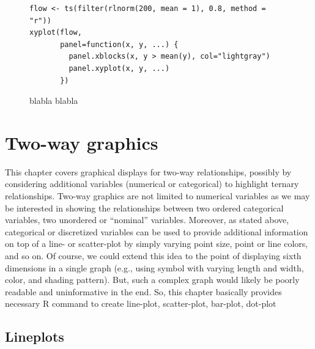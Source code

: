 \documentclass[a4paper,twoside]{book}
\newcounter{fig}
\newcommand{\img}[1]{\texttt{[image: \#1]}\stepcounter{fig}}
\renewcommand{\texttt}[1]{\lstinline{#1}}
\newcommand{\R}{\textsf{R}\xspace}
\begin{document}
\begin{figure}[H]
\begin{lstlisting}
flow <- ts(filter(rlnorm(200, mean = 1), 0.8, method = "r"))
xyplot(flow, 
       panel=function(x, y, ...) {
         panel.xblocks(x, y > mean(y), col="lightgray")
         panel.xyplot(x, y, ...)
       })
\end{lstlisting}
  \fcapside[\FBwidth] {\img{figs_lattice-crop}}
  {\caption*{blabla blabla}}
\end{figure}



\chapter{Two-way graphics}

This chapter covers graphical displays for two-way relationships,
possibly by considering additional variables (numerical or
categorical) to highlight ternary relationships. Two-way graphics are
not limited to numerical variables as we may be interested in showing
the relationships between two ordered categorical variables, two
unordered or ``nominal'' variables. Moreover, as stated above,
categorical or discretized variables can be used to provide additional
information on top of a line- or scatter-plot by simply varying point
size, point or line colors, and so on. Of course, we could extend this
idea to the point of displaying sixth dimensions in a single graph
(e.g., using symbol with varying length and width, color, and shading
pattern). But, such a complex graph would likely be poorly
readable and uninformative in the end. So, this chapter basically
provides necessary \R command to create line-plot, scatter-plot,
bar-plot, dot-plot


\section{Lineplots}

\end{document}
